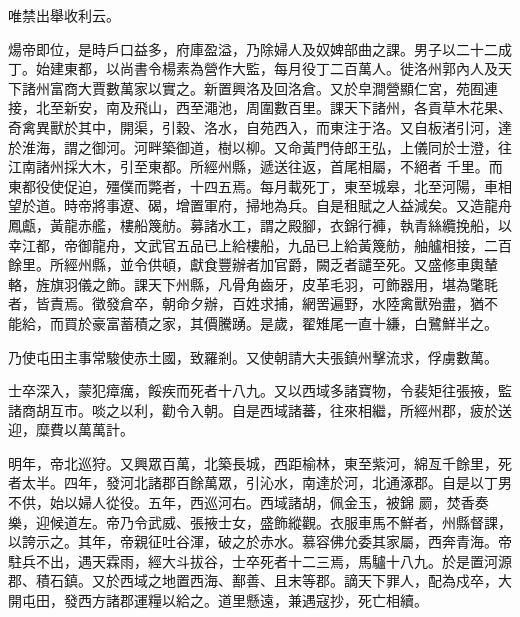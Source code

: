 \begin{pinyinscope}
 唯禁出舉收利云。



 煬帝即位，是時戶口益多，府庫盈溢，乃除婦人及奴婢部曲之課。男子以二十二成丁。始建東都，以尚書令楊素為營作大監，每月役丁二百萬人。徙洛州郭內人及天下諸州富商大賈數萬家以實之。新置興洛及回洛倉。又於皁澗營顯仁宮，苑囿連接，北至新安，南及飛山，西至澠池，周圍數百里。課天下諸州，各貢草木花果、奇禽異獸於其中，開渠，引穀、洛水，自苑西入，而東注于洛。又自板渚引河，達於淮海，謂之御河。河畔築御道，樹以柳。又命黃門侍郎王弘，上儀同於士澄，往江南諸州採大木，引至東都。所經州縣，遞送往返，首尾相屬，不絕者
 千里。而東都役使促迫，殭僕而斃者，十四五焉。每月載死丁，東至城皋，北至河陽，車相望於道。時帝將事遼、碣，增置軍府，掃地為兵。自是租賦之人益減矣。又造龍舟鳳甗，黃龍赤艦，樓船篾舫。募諸水工，謂之殿腳，衣錦行褲，執青絲纜挽船，以幸江都，帝御龍舟，文武官五品已上給樓船，九品已上給黃篾舫，舳艫相接，二百餘里。所經州縣，並令供頓，獻食豐辦者加官爵，闕乏者譴至死。又盛修車輿輦輅，旌旗羽儀之飾。課天下州縣，凡骨角齒牙，皮革毛羽，可飾器用，堪為氅毦者，皆責焉。徵發倉卒，朝命夕辦，百姓求捕，網罟遍野，水陸禽獸殆盡，猶不
 能給，而買於豪富蓄積之家，其價騰踴。是歲，翟雉尾一直十縑，白鷺鮮半之。



 乃使屯田主事常駿使赤土國，致羅剎。又使朝請大夫張鎮州擊流求，俘虜數萬。



 士卒深入，蒙犯瘴癘，餒疾而死者十八九。又以西域多諸寶物，令裴矩往張掖，監諸商胡互市。啖之以利，勸令入朝。自是西域諸蕃，往來相繼，所經州郡，疲於送迎，糜費以萬萬計。



 明年，帝北巡狩。又興眾百萬，北築長城，西距榆林，東至紫河，綿亙千餘里，死者太半。四年，發河北諸郡百餘萬眾，引沁水，南達於河，北通涿郡。自是以丁男不供，始以婦人從役。五年，西巡河右。西域諸胡，佩金玉，被錦
 罽，焚香奏樂，迎候道左。帝乃令武威、張掖士女，盛飾縱觀。衣服車馬不鮮者，州縣督課，以誇示之。其年，帝親征吐谷渾，破之於赤水。慕容佛允委其家屬，西奔青海。帝駐兵不出，遇天霖雨，經大斗拔谷，士卒死者十二三焉，馬驢十八九。於是置河源郡、積石鎮。又於西域之地置西海、鄯善、且末等郡。謫天下罪人，配為戍卒，大開屯田，發西方諸郡運糧以給之。道里懸遠，兼遇寇抄，死亡相續。




\end{pinyinscope}
